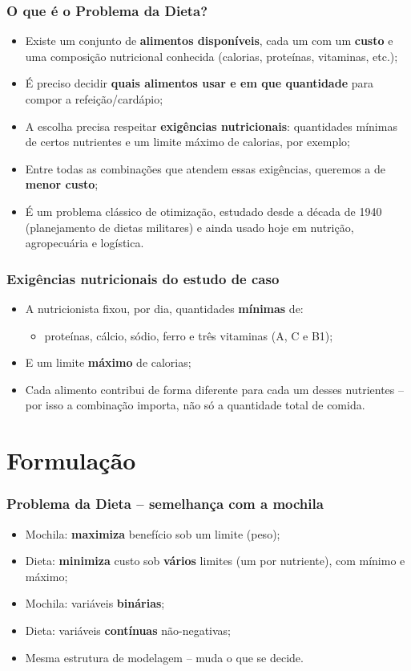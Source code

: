 \documentclass[fleqn]{beamer}
\begin{document}
\begin{frame}
	\frametitle{O que é o Problema da Dieta?}
	\begin{itemize}
		\item Existe um conjunto de \textbf{alimentos disponíveis}, cada
			um com um \textbf{custo} e uma composição nutricional
			conhecida (calorias, proteínas, vitaminas, etc.);
		\item É preciso decidir \textbf{quais alimentos usar e em que
			quantidade} para compor a refeição/cardápio;
		\item A escolha precisa respeitar \textbf{exigências
			nutricionais}: quantidades mínimas de certos nutrientes e um
			limite máximo de calorias, por exemplo;
		\item Entre todas as combinações que atendem essas exigências,
			queremos a de \textbf{menor custo};
		\item É um problema clássico de otimização, estudado desde a
			década de 1940 (planejamento de dietas militares) e ainda
			usado hoje em nutrição, agropecuária e logística.
	\end{itemize}
\end{frame}

\begin{frame}
	\frametitle{Exigências nutricionais do estudo de caso}
	\begin{itemize}
		\item A nutricionista fixou, por dia, quantidades
			\textbf{mínimas} de:
		\begin{itemize}
			\item proteínas, cálcio, sódio, ferro e três vitaminas
				(A, C e B1);
		\end{itemize}
		\item E um limite \textbf{máximo} de calorias;
		\item Cada alimento contribui de forma diferente para cada um
			desses nutrientes -- por isso a combinação importa, não só
			a quantidade total de comida.
	\end{itemize}
\end{frame}

\section{Formulação}

\begin{frame}
	\frametitle{Problema da Dieta -- semelhança com a mochila}
	\begin{itemize}
		\item Mochila: \textbf{maximiza} benefício sob um limite (peso);
		\item Dieta: \textbf{minimiza} custo sob \textbf{vários} limites
			(um por nutriente), com mínimo e máximo;
		\item Mochila: variáveis \textbf{binárias};
		\item Dieta: variáveis \textbf{contínuas} não-negativas;
		\item Mesma estrutura de modelagem -- muda o que se decide.
	\end{itemize}
\end{frame}
\end{document}
